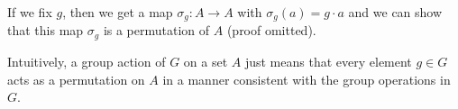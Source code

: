 If we fix $g$, then we get a map $\sigma_g: A \rightarrow A$ with $\sigma_g(a) = g \cdot a$ and we can show that this map $\sigma_g$ is a permutation of $A$ (proof omitted).

Intuitively, a group action of $G$ on a set $A$ just means that every element $g \in G$ acts as a permutation on $A$ in a manner consistent with the group operations in $G$.

